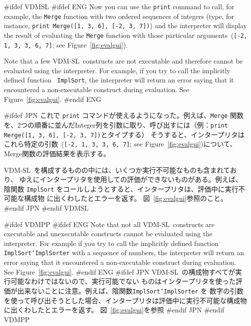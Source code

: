 \documentclass[\pformat,12pt]{article}
\newcommand{\vdmslpp}{VDM-SL}
\newcommand{\vdmslpp}{VDM++}
\newcommand{\aaa}{\tt }
\begin{document}
#ifdef VDMSL 
#ifdef ENG
Now you can use the {\tt print} command to call, for example, the
{\aaa Merge} function with two ordered sequences of integers (type,
for instance, {\tt print Merge([1, 3, 6], [-2, 3, 7])}) and the
interpreter will display the result of evaluating the {\aaa Merge}
function with those particular arguments~({\tt [-2, 1, 3, 3, 6, 7]};
see Figure~\ref{fig:evalgui}).

Note that a few \vdmslpp\ constructs are not executable and therefore
cannot be evaluated using the interpreter. For example, if you try
to call the implicitly defined function   {\aaa
  ImplSort}, the interpreter will return an error saying that it
encountered a non-executable construct during evaluation.  See Figure~\ref{fig:evalgui}. 
#endif ENG

#ifdef JPN
これで {\tt print} コマンドが使えるようになった。例えば、{\aaa Merge} 関数
を、2つの順番に並んだInteger列を引数に取り、呼び出すには（例：{\tt print Merge([1, 3, 6], [-2, 3, 7])}とタイプする）
そうすると、インタープリタはこれら特定の引数~({\tt [-2, 1, 3, 3, 6, 7]};
see Figure~\ref{fig:evalgui})について、Merge関数の評価結果を表示する。 

 \vdmslpp\ を構成するものの中には、いくつか実行不可能なものも含まれており、
 ゆえにインタープリタを使用しての評価ができないものがある。例えば、陰関数
  {\aaa ImplSort}
 をコールしようとすると、インタープリタは、評価中に実行不可能な構成物
 に出くわしたとエラーを返す。
 図~\ref{fig:evalgui}参照のこと。
#endif JPN
#endif VDMSL

#ifdef VDMPP
#ifdef ENG
Note that not all \vdmslpp\ constructs are executable and unexecutable
constructs cannot be evaluated using the interpreter.  For example if
you try to call the implicitly defined function {\aaa
  ImplSort`ImplSorter} with a sequence of numbers, the interpreter
will return an error saying that it encountered a non-executable construct
 during evaluation. See
Figure~\ref{fig:evalgui}.
#endif ENG
#ifdef JPN
\vdmslpp\ の構成物すべてが実行可能なわけではないので、実行可能でない
ものはインタープリタを使った評価が出来ないことに注意。例えば、陰関数{\aaa ImplSort`ImplSorter} を
数字の引数を使って呼び出そうとした場合、インタープリタは評価中に実行不可能な構成物
に出くわしたとエラーを返す。
図~\ref{fig:evalgui}を参照
#endif JPN
#endif VDMPP
\end{document}
